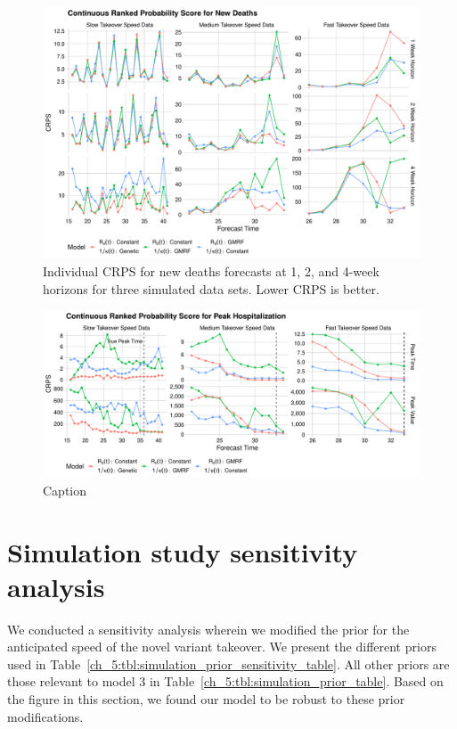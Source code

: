 \begin{figure}
    \centering
    \includegraphics[width=1.0\columnwidth]{simulated_crps_comparison_data_new_deaths_plot}
    \caption{Individual CRPS for new deaths forecasts at 1, 2, and 4-week horizons for three simulated data sets. Lower CRPS is better.}
    \label{ch_5:fig:simulated_crps_comparison_data_new_deaths_plot}
\end{figure}

\begin{figure}
    \centering
    \includegraphics[width=1.0\columnwidth]{simulated_peak_crps_plot}
    \caption{Caption}
    \label{ch_5:fig:simulated_peak_crps_plot}
\end{figure}

\section{Simulation study sensitivity analysis}
\label{ch_5:sec:sim_sensitivity}

We conducted a sensitivity analysis wherein we modified the prior for the anticipated speed of the novel variant takeover.
We present the different priors used in Table~\ref{ch_5:tbl:simulation_prior_sensitivity_table}.
All other priors are those relevant to model 3 in Table~\ref{ch_5:tbl:simulation_prior_table}.
Based on the figure in this section, we found our model to be robust to these prior modifications.

